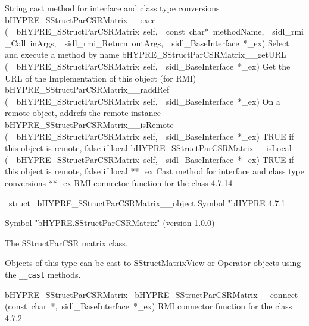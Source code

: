 \documentclass{article}
\begin{document}
\begin{cxxentry}
\begin{cxxentry}
\begin{cxxnames}
        {
String cast method for interface and class type conversions}
        {}
\label{cxx.4.7.35}
        {bHYPRE\_SStructParCSRMatrix\_\_exec}
        {(\ \ bHYPRE\_SStructParCSRMatrix\ self,\ \ const\ char*\ methodName,\ \ sidl\_rmi\_Call\ inArgs,\ \ sidl\_rmi\_Return\ outArgs,\ \ sidl\_BaseInterface\ *\_ex)}
        {
Select and execute a method by name}
        {}
\label{cxx.4.7.36}
        {bHYPRE\_SStructParCSRMatrix\_\_getURL}
        {(\ \ bHYPRE\_SStructParCSRMatrix\ self,\ \ sidl\_BaseInterface\ *\_ex)}
        {
Get the URL of the Implementation of this object (for RMI)}
        {}
\label{cxx.4.7.37}
        {bHYPRE\_SStructParCSRMatrix\_\_raddRef}
        {(\ \ bHYPRE\_SStructParCSRMatrix\ self,\ \ sidl\_BaseInterface\ *\_ex)}
        {
On a remote object, addrefs the remote instance}
        {}
\label{cxx.4.7.38}
        {bHYPRE\_SStructParCSRMatrix\_\_isRemote}
        {(\ \ bHYPRE\_SStructParCSRMatrix\ self,\ \ sidl\_BaseInterface\ *\_ex)}
        {
TRUE if this object is remote, false if local}
        {}
\label{cxx.4.7.39}
        {bHYPRE\_SStructParCSRMatrix\_\_isLocal}
        {(\ \ bHYPRE\_SStructParCSRMatrix\ self,\ \ sidl\_BaseInterface\ *\_ex)}
        {
TRUE if this object is remote, false if local}
        {}
\label{cxx.4.7.40}
        {**\_ex}
        {}
        {
Cast method for interface and class type conversions}
        {}
\label{cxx.4.7.41}
        {**\_ex}
        {}
        {
RMI connector function for the class}
        {4.7.14}
\end{cxxnames}
\begin{cxxvariable}
{\ struct\ }
        {bHYPRE\_SStructParCSRMatrix\_\_object}
        {}
        {
Symbol "bHYPRE}
        {4.7.1}
\begin{cxxdoc}

Symbol "bHYPRE.SStructParCSRMatrix" (version 1.0.0)

The SStructParCSR matrix class.

Objects of this type can be cast to SStructMatrixView or
Operator objects using the {\tt \_\_cast} methods.
\end{cxxdoc}
\end{cxxvariable}
\begin{cxxfunction}
{bHYPRE\_SStructParCSRMatrix\ }
        {bHYPRE\_SStructParCSRMatrix\_\_connect}
        {(const\ char\ *,\ sidl\_BaseInterface\ *\_ex)}
        {
RMI connector function for the class}
        {4.7.2}
\begin{cxxdoc}


\end{cxxdoc}
\end{cxxfunction}
\end{cxxentry}
\end{cxxentry}
\end{document}
